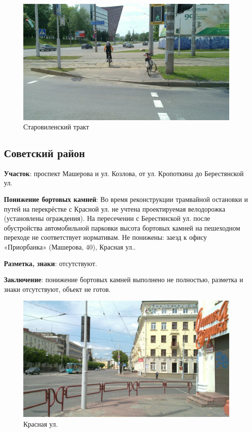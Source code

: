 \documentclass[a4paper,14pt,twoside]{extarticle}
\renewcommand\emph[1]{\textbf{#1}}
\begin{document}
\begin{figure}[h!]
    \centering
    \includegraphics[width=\textwidth]{Pictures/1000000000000A00000005A0DC8DFB74.jpg}
    \caption{Старовиленский тракт}
\end{figure}

\clearpage
\newpage

\subsection*{Советский район}
\emph{Участок}: проспект Машерова и ул. Козлова, от ул. Кропоткина до Берестянской ул.

\emph{Понижение бортовых камней}: Во время реконструкции трамвайной остановки и путей на перекрёстке с Красной ул. не учтена проектируемая велодорожка (установлены ограждения). На пересечении с Берестянской ул. после обустройства автомобильной парковки высота бортовых камней на пешеходном переходе не соответствует нормативам. Не понижены: заезд к офису «Приорбанка» (Машерова, 40), Красная ул..

\emph{Разметка, знаки}: отсутствуют.

\emph{Заключение}: понижение бортовых камней выполнено не полностью, разметка и знаки отсутствуют, объект не готов.

\begin{figure}[h!]
    \centering
    \includegraphics[width=\textwidth]{Pictures/1000000000000A00000005A061034552.jpg}
    \caption{Красная ул.}
\end{figure}
\end{document}
